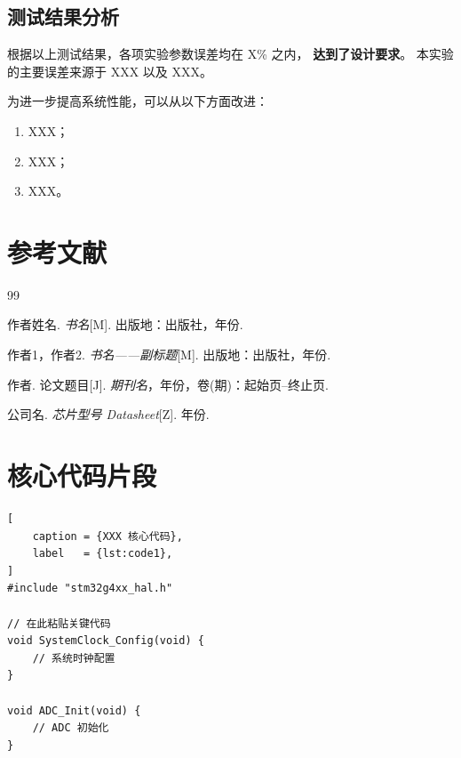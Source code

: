 \documentclass[a4paper, zihao=-4, linespread=1.5, AutoFakeBold]{ctexart}
\newcommand{\题号}[1]{\def\theProblemNum{#1}}
\newcommand{\参赛编号}[1]{\def\theTeamNum{#1}}
\newcommand{\队员}[1]{\def\theMembers{#1}}
\begin{document}
\subsection{测试结果分析}

根据以上测试结果，各项实验参数误差均在 X\% 之内，
\textbf{达到了设计要求}。
本实验的主要误差来源于 XXX 以及 XXX。

为进一步提高系统性能，可以从以下方面改进：
\begin{enumerate}[leftmargin=2em, itemsep=2pt]
    \item XXX；
    \item XXX；
    \item XXX。
\end{enumerate}

\section{参考文献}

\begin{thebibliography}{99}

    作者姓名.
    \textit{书名}[M].
    出版地：出版社，年份.

    作者1，作者2.
    \textit{书名——副标题}[M].
    出版地：出版社，年份.

    作者.
    论文题目[J].
    \textit{期刊名}，年份，卷(期)：起始页--终止页.

    公司名.
    \textit{芯片型号 Datasheet}[Z].
    年份.

\end{thebibliography}

\newpage
\appendix
\renewcommand{\thesection}{附录\Alph{section}}

\section{核心代码片段}

\begin{lstlisting}[
    caption = {XXX 核心代码},
    label   = {lst:code1},
]
#include "stm32g4xx_hal.h"

// 在此粘贴关键代码
void SystemClock_Config(void) {
    // 系统时钟配置
}

void ADC_Init(void) {
    // ADC 初始化
}
\end{lstlisting}
\end{document}
